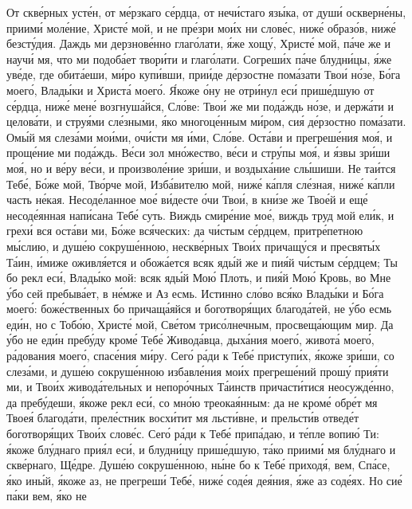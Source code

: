 \begin{mymulticols}
От скв\'{е}рных уст\'{е}н, от м\'{е}рзкаго с\'{е}рдца, от неч\'{и}стаго яз\'{ы}ка, от душ\'{и} оскверн\'{е}ны, приим\'{и} мол\'{е}ние, Христ\'{е} мой, и не пр\'{е}зри мо\'{и}х ни слов\'{е}с, ниж\'{е} образ\'{о}в, ниж\'{е} безст\'{у}дия. Даждь ми дерзнов\'{е}нно глаг\'{о}лати, \'{я}же хощ\'{у}, Христ\'{е} мой, п\'{а}че же и науч\'{и} мя, что ми подоб\'{а}ет твор\'{и}ти и глаг\'{о}лати. Согреш\'{и}х п\'{а}че блудн\'{и}цы, \'{я}же ув\'{е}де, где обит\'{а}еши, м\'{и}ро куп\'{и}вши, при\'{и}де д\'{е}рзостне пом\'{а}зати Тво\'{и} н\'{о}зе, Б\'{о}га моег\'{о}, Влад\'{ы}ки и Христ\'{а} моег\'{о}. \'{Я}коже \'{о}ну не отр\'{и}нул ес\'{и} приш\'{е}дшую от с\'{е}рдца, ниж\'{е} мен\'{е} возгнуш\'{а}йся, Сл\'{о}ве: Тво\'{и} же ми под\'{а}ждь н\'{о}зе, и держ\'{а}ти и целов\'{а}ти, и стру\'{я}ми сл\'{е}зными, \'{я}ко многоц\'{е}нным м\'{и}ром, си\'{я} д\'{е}рзостно пом\'{а}зати. Ом\'{ы}й мя слез\'{а}ми мо\'{и}ми, оч\'{и}сти мя \'{и}ми, Сл\'{о}ве. Ост\'{а}ви и прегреш\'{е}ния мо\'{я}, и прощ\'{е}ние ми под\'{а}ждь. В\'{е}си зол мн\'{о}жество, в\'{е}си и стр\'{у}пы мо\'{я}, и \'{я}звы зр\'{и}ши мо\'{я}, но и в\'{е}ру в\'{е}си, и произвол\'{е}ние зр\'{и}ши, и воздых\'{а}ние сл\'{ы}шиши. Не та\'{и}тся Теб\'{е}, Б\'{о}же мой, Тв\'{о}рче мой, Изб\'{а}вителю мой, ниж\'{е} к\'{а}пля сл\'{е}зная, ниж\'{е} к\'{а}пли часть н\'{е}кая. Несод\'{е}ланное мо\'{е} в\'{и}десте \'{о}чи Тво\'{и}, в кн\'{и}зе же Тво\'{е}й и ещ\'{е} несод\'{е}янная нап\'{и}сана Теб\'{е} суть. Виждь смир\'{е}ние мо\'{е}, виждь труд мой ел\'{и}к, и грех\'{и} вся ост\'{а}ви ми, Б\'{о}же вс\'{я}ческих: да ч\'{и}стым с\'{е}рдцем, притр\'{е}петною м\'{ы}слию, и душ\'{е}ю сокруш\'{е}нною, нескв\'{е}рных Тво\'{и}х причащ\'{у}ся и пресвят\'{ы}х Т\'{а}ин, \'{и}миже оживл\'{я}ется и обож\'{а}ется всяк яд\'{ы}й же и пи\'{я}й ч\'{и}стым с\'{е}рдцем; Ты бо рекл ес\'{и}, Влад\'{ы}ко мой: всяк яд\'{ы}й Мо\'{ю} Плоть, и пи\'{я}й Мо\'{ю} Кровь, во Мне \'{у}бо сей пребыв\'{а}ет, в н\'{е}мже и Аз есмь. Истинно сл\'{о}во вс\'{я}ко Влад\'{ы}ки и Б\'{о}га моег\'{о}: бож\'{е}ственных бо причащ\'{а}яйся и боготвор\'{я}щих благод\'{а}тей, не \'{у}бо есмь ед\'{и}н, но с Тоб\'{о}ю, Христ\'{е} мой, Св\'{е}том трис\'{о}лнечным, просвещ\'{а}ющим мир. Да \'{у}бо не ед\'{и}н преб\'{у}ду кром\'{е} Теб\'{е} Живод\'{а}вца, дых\'{а}ния моег\'{о}, живот\'{а} моег\'{о}, р\'{а}дования моег\'{о}, спас\'{е}ния м\'{и}ру. Сег\'{о} р\'{а}ди к Теб\'{е} приступ\'{и}х, \'{я}коже зр\'{и}ши, со слез\'{а}ми, и душ\'{е}ю сокруш\'{е}нною избавл\'{е}ния мо\'{и}х прегреш\'{е}ний прош\'{у} при\'{я}ти ми, и Тво\'{и}х живод\'{а}тельных и непор\'{о}чных Т\'{а}инств причаст\'{и}тися неосужд\'{е}нно, да преб\'{у}деши, \'{я}коже рекл ес\'{и}, со мн\'{о}ю треока\'{я}нным: да не кром\'{е} обр\'{е}т мя Твое\'{я} благод\'{а}ти, прел\'{е}стник восх\'{и}тит мя льст\'{и}вне, и прельст\'{и}в отвед\'{е}т боготвор\'{я}щих Тво\'{и}х слов\'{е}с. Сег\'{о} р\'{а}ди к Теб\'{е} прип\'{а}даю, и т\'{е}пле вопи\'{ю} Ти: \'{я}коже бл\'{у}днаго при\'{я}л ес\'{и}, и блудн\'{и}цу приш\'{е}дшую, т\'{а}ко приим\'{и} мя бл\'{у}днаго и скв\'{е}рнаго, Щ\'{е}дре. Душ\'{е}ю сокруш\'{е}нною, н\'{ы}не бо к Теб\'{е} приход\'{я}, вем, Сп\'{а}се, \'{я}ко ин\'{ы}й, \'{я}коже аз, не прегреш\'{и} Теб\'{е}, ниж\'{е} сод\'{е}я де\'{я}ния, \'{я}же аз сод\'{е}ях. Но си\'{е} п\'{а}ки вем, \'{я}ко не 
\end{mymulticols}
